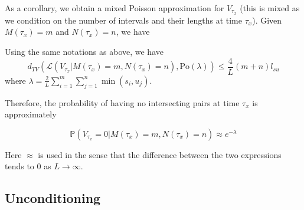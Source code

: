 \documentclass{article}
\begin{document}
As a corollary, we obtain a mixed Poisson approximation for $V_{\tau_x}$ (this is mixed as we condition on the number of intervals and their lengths at time $\tau_x$). Given $M(\tau_x)=m$ and $N(\tau_x)=n$, we have

\begin{corollary}
    Using the same notations as above, we have
    \begin{equation*}
        d_{TV}(\mathcal{L}(V_{\tau_x}|M(\tau_x)=m, N(\tau_x)=n), \mathrm{Po}(\lambda)) \leq \frac{4}{L}(m+n) l_{su}
    \end{equation*}
    where $\lambda = \frac{2}{L}\sum_{i=1}^{m}\sum_{j=1}^{n} \min(s_i, u_j)$.
\end{corollary}

Therefore, the probability of having no intersecting pairs at time $\tau_x$ is approximately  

\begin{equation*}
    \mathbb{P} (V_{\tau_x} = 0 | M(\tau_x) = m, N(\tau_x) = n) \approx e^{-\lambda}
\end{equation*}

Here $\approx$ is used in the sense that the difference between the two expressions tends to $0$ as $L\to \infty$.  


\subsection{Unconditioning}





\newpage


\end{document}
